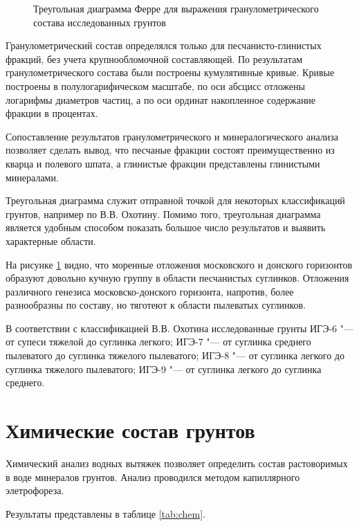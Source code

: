 \begin{figure}[ht]
    
    \caption{Треугольная диаграмма Ферре для выражения гранулометрического состава исследованных грунтов} \label{Fig:Ferre}
\end{figure}

Гранулометрический состав определялся только для песчанисто-глинистых фракций, без учета крупнообломочной составляющей.
По результатам гранулометрического состава были построены кумулятивные кривые.
Кривые построены в полулогарифическом масштабе, 
по оси абсцисс отложены логарифмы диаметров частиц, 
а по оси ординат накопленное содержание фракции в процентах.

Сопоставление результатов гранулометрического и минералогического анализа позволяет сделать вывод, 
что песчаные фракции состоят преимущественно из кварца и полевого шпата, 
а глинистые фракции представлены глинистыми минералами.

Треугольная диаграмма служит отправной точкой для некоторых классификаций грунтов, например по В.\;В. Охотину.
Помимо того, треугольная диаграмма является удобным способом показать большое число результатов и выявить характерные области.

На рисунке \ref{Fig:Ferre} видно, что моренные отложения московского и донского горизонтов образуют довольно кучную группу в области песчанистых суглинков.
Отложения различного генезиса московско-донского горизонта, напротив, более разнообразны по составу, но тяготеют к области 
пылеватых суглинков.

 В соответствии с классификацией В.\;В. Охотина исследованные грунты 
 ИГЭ-6 "--- от супеси тяжелой до суглинка легкого;
 ИГЭ-7 "--- от суглинка среднего пылеватого до суглинка тяжелого пылеватого;
 ИГЭ-8 "--- от суглинка легкого до суглинка тяжелого пылеватого;
 ИГЭ-9 "--- от суглинка легкого до суглинка среднего.

 
\section{Химические состав грунтов}

Химический анализ водных вытяжек позволяет определить состав растоворимых в воде минералов грунтов.
Анализ проводился методом капиллярного элетрофореза. 

Результаты представлены в таблице \ref{tab:chem}.

